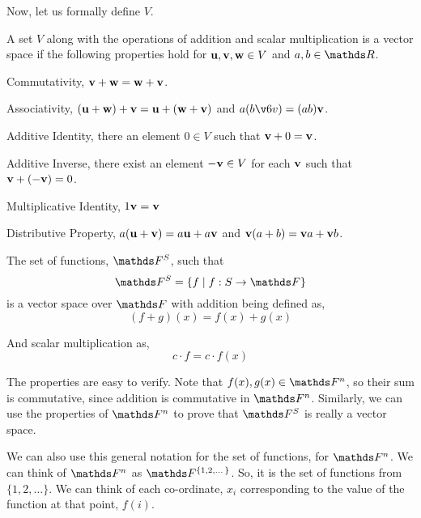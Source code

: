 Now, let us formally define \(V\). 

\begin{definition}
    A set \(V\) along with the operations of addition and scalar multiplication is a vector
    space if the following properties hold for \(\boldsymbol{\mathbf{u}}, \boldsymbol{\mathbf{v}}, \boldsymbol{\mathbf{w}} \in V\) and \(a, b \in \RR\).

    \begin{axioms}
        \item Commutativity, \(\boldsymbol{\mathbf{v}} + \boldsymbol{\mathbf{w}} = \boldsymbol{\mathbf{w}} + \boldsymbol{\mathbf{v}}\).
        \item Associativity, \((\boldsymbol{\mathbf{u}} + \boldsymbol{\mathbf{w}}) + \boldsymbol{\mathbf{v}} = \boldsymbol{\mathbf{u}} + (\boldsymbol{\mathbf{w}} + \boldsymbol{\mathbf{v}})\) and \(a(b\v6v) = (ab)\vv\).
        \item Additive Identity, there an element \(0 \in V\) such that \(\boldsymbol{\mathbf{v}} + 0 = \boldsymbol{\mathbf{v}}\).
        \item Additive Inverse, there exist an element \(-\boldsymbol{\mathbf{v}} \in V\) for each \(\boldsymbol{\mathbf{v}}\) such that 
        \(\boldsymbol{\mathbf{v}} + (-\boldsymbol{\mathbf{v}}) = 0\).
        \item Multiplicative Identity, \(1\boldsymbol{\mathbf{v}} = \boldsymbol{\mathbf{v}}\)
        \item Distributive Property, \(a(\boldsymbol{\mathbf{u}} + \boldsymbol{\mathbf{v}}) = a\boldsymbol{\mathbf{u}} + a\boldsymbol{\mathbf{v}}\) and \(\boldsymbol{\mathbf{v}}(a + b) = \boldsymbol{\mathbf{v}} a + \boldsymbol{\mathbf{v}} b\). 
    \end{axioms}

\end{definition}

\begin{example}
    The set of functions, \(\FF^S\), such that \[ \FF^S = \{ f \given f : S \to \FF\}\]
    is a vector space over \(\FF\) with addition being defined as, 
    \begin{equation*}
    (f + g)(x) = f(x) + g(x)
    \end{equation*}

    And scalar multiplication as, 
    \begin{equation*}
        c \cdot f = c \cdot f(x)
    \end{equation*}

    The properties are easy to verify. Note that \(f(x), g(x) \in \FF^n\), so their sum is commutative, since 
    addition is commutative in \(\FF^n\). Similarly, we can use the properties of \(\FF^n\) to 
    prove that \(\FF^S\) is really a vector space.
\end{example}

We can also use this general notation for the set of functions, for \(\FF^n\). 
We can think of \(\FF^n\) as \(\FF^{\{1, 2, \dots\}}\). So, it is the set of functions 
from \(\{1, 2, \dots\}\). We can think of each co-ordinate, \(x_i\) corresponding to 
the value of the function at that point, \(f(i)\).

